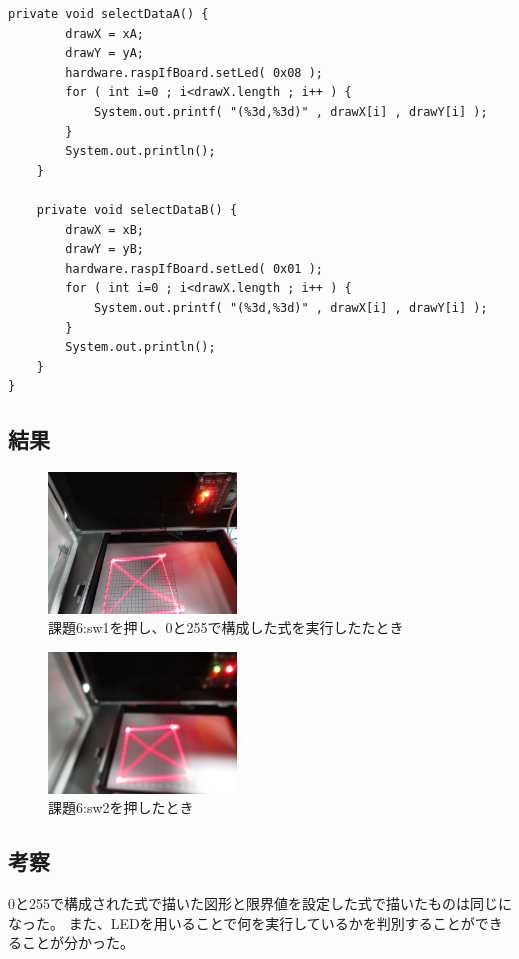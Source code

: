 \documentclass{jarticle}
\begin{document}
\begin{lstlisting}[caption=CheckDrawArea]
    private void selectDataA() {
        drawX = xA;
        drawY = yA;
        hardware.raspIfBoard.setLed( 0x08 );
        for ( int i=0 ; i<drawX.length ; i++ ) {
            System.out.printf( "(%3d,%3d)" , drawX[i] , drawY[i] );
        }
        System.out.println();
    }

    private void selectDataB() {
        drawX = xB;
        drawY = yB;
        hardware.raspIfBoard.setLed( 0x01 );
        for ( int i=0 ; i<drawX.length ; i++ ) {
            System.out.printf( "(%3d,%3d)" , drawX[i] , drawY[i] );
        }
        System.out.println();
    }
}

\end{lstlisting}
\newpage
\subsection{結果}

\begin{figure}[h]
    \centering
    
    \includegraphics[width=5cm]{IMG_1736.JPG}
    \caption{課題6:sw1を押し、0と255で構成した式を実行したたとき}
    \label{fig:my_label}
\end{figure}

\begin{figure}[h]
    \centering
    
    \includegraphics[width=5cm]{IMG_1737.JPG}
    \caption{課題6:sw2を押したとき}
    \label{fig:my_label}
\end{figure}


\subsection{考察}
0と255で構成された式で描いた図形と限界値を設定した式で描いたものは同じになった。
また、LEDを用いることで何を実行しているかを判別することができることが分かった。
\end{document}
